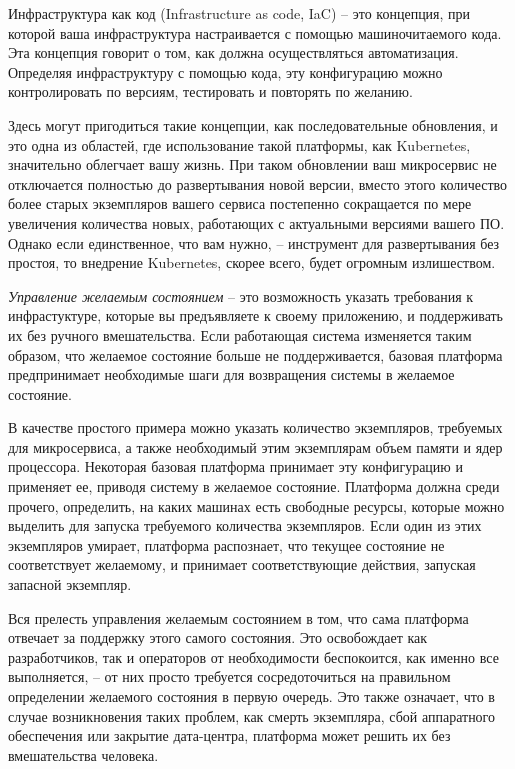 \documentclass[%
	11pt,
	a4paper,
	utf8,
		]{article}
\begin{document}
Инфраструктура как код (Infrastructure as code, IaC) -- это концепция, при которой ваша инфраструктура настраивается с помощью машиночитаемого кода. Эта концепция говорит о том, как должна осуществляться автоматизация. Определяя инфраструктуру с помощью кода, эту конфигурацию можно контролировать по версиям, тестировать и повторять по желанию.

Здесь могут пригодиться такие концепции, как последовательные обновления, и это одна из областей, где использование такой платформы, как Kubernetes, значительно облегчает вашу жизнь. При таком обновлении ваш микросервис не отключается полностью до развертывания новой версии, вместо этого количество более старых экземпляров вашего сервиса постепенно сокращается по мере увеличения количества новых, работающих с актуальными версиями вашего ПО. Однако если единственное, что вам нужно, -- инструмент для развертывания без простоя, то внедрение Kubernetes, скорее всего, будет огромным излишеством. 

\emph{Управление желаемым состоянием} -- это возможность указать требования к инфрастуктуре, которые вы предъявляете к своему приложению, и поддерживать их без ручного вмешательства. Если работающая система изменяется таким образом, что желаемое состояние больше не поддерживается, базовая платформа предпринимает необходимые шаги для возвращения системы в желаемое состояние.

В качестве простого примера можно указать количество экземпляров, требуемых для микросервиса, а также необходимый этим экземплярам объем памяти и ядер процессора. Некоторая базовая платформа принимает эту конфигурацию и применяет ее, приводя систему в желаемое состояние. Платформа должна среди прочего, определить, на каких машинах есть свободные ресурсы, которые можно выделить для запуска требуемого количества экземпляров. Если один из этих экземпляров умирает, платформа распознает, что текущее состояние не соответствует желаемому, и принимает соответствующие действия, запуская запасной экземпляр.

Вся прелесть управления желаемым состоянием в том, что сама платформа отвечает за поддержку этого самого состояния. Это освобождает как разработчиков, так и операторов от необходимости беспокоится, как именно все выполняется, -- от них просто требуется сосредоточиться на правильном определении желаемого состояния в первую очередь. Это также означает, что в случае возникновения таких проблем, как смерть экземпляра, сбой аппаратного обеспечения или закрытие дата-центра, платформа может решить их без вмешательства человека.
\end{document}
